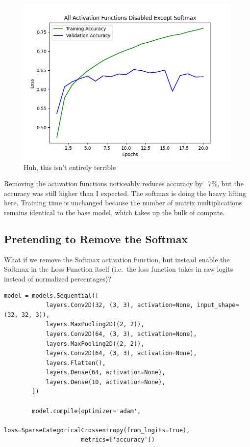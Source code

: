 \documentclass{article}
\begin{document}
    \begin{figure}[!htbp]
        \centerline{\includegraphics[width=0.55\columnwidth]{All Activation Functions Disabled Except Softmax}}
        \caption{Huh, this isn't entirely terrible}
        \label{fig:softmax-only1}
    \end{figure}

    Removing the activation functions noticeably reduces accuracy by ~7\%, but the accuracy was still higher than I expected.
    The softmax is doing the heavy lifting here.
    Training time is unchanged because the number of matrix multiplications remains identical to the base model, which takes up the bulk of compute.

    \subsection{Pretending to Remove the Softmax}\label{subsec:pretending-to-remove-the-softmax}

    What if we remove the Softmax activation function, but instead enable the Softmax in the Loss Function itself (i.e.\ the loss function takes in raw logits instead of normalized percentages)?

    \begin{lstlisting}[label={lst:no_softmax_jk}]
        model = models.Sequential([
            layers.Conv2D(32, (3, 3), activation=None, input_shape=(32, 32, 3)),
            layers.MaxPooling2D((2, 2)),
            layers.Conv2D(64, (3, 3), activation=None),
            layers.MaxPooling2D((2, 2)),
            layers.Conv2D(64, (3, 3), activation=None),
            layers.Flatten(),
            layers.Dense(64, activation=None),
            layers.Dense(10, activation=None),
        ])

        model.compile(optimizer='adam',
                      loss=SparseCategoricalCrossentropy(from_logits=True),
                      metrics=['accuracy'])
    \end{lstlisting}
\end{document}
